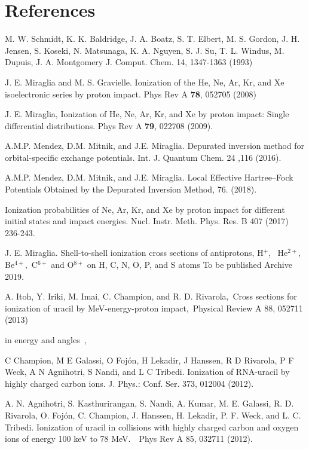 \documentclass[preprint,showpacs,pra]{revtex4-1}
\begin{document}
\bigskip

\section{References}

\begin{thebibliography}{99}

M. W. Schmidt, K. K. Baldridge, J. A. Boatz, S. T. Elbert, M. S. Gordon, 
J. H. Jensen, S. Koseki, N. Matsunaga, K. A. Nguyen, S. J. Su, T. L. Windus, 
M. Dupuis, J. A. Montgomery 
J. Comput. Chem. 14, 1347-1363 (1993)

J. E. Miraglia and M. S. Gravielle. Ionization of the
He, Ne, Ar, Kr, and Xe isoelectronic series by proton impact. Phys Rev A 
\textbf{78}, 052705 (2008)

J. E. Miraglia, Ionization of He, Ne, Ar, Kr, and Xe
by proton impact: Single differential distributions. Phys Rev A \textbf{79},
022708 (2009).

A.M.P. Mendez, D.M. Mitnik, and J.E. Miraglia.
Depurated inversion method for orbital-specific exchange potentials. 
Int. J. Quantum Chem. 24 ,116 (2016).

A.M.P. Mendez, D.M. Mitnik, and J.E. Miraglia. Local Effective 
Hartree--Fock Potentials Obtained by the Depurated Inversion Method,
76. (2018).

Ionization probabilities of Ne, Ar, Kr, and Xe by
proton impact for different initial states and impact energies. Nucl. Instr.
Meth. Phys. Res. B 407 (2017) 236-243.

J. E. Miraglia. Shell-to-shell ionization cross
sections of antiprotons, H$^{+}$, \ He$^{2+},$ Be$^{4+},$ C$^{6+}$ and O$%
^{8+}$ on H, C, N, O, P, and S atoms To be published Archive 2019.

A. Itoh, Y. Iriki, M. Imai, C. Champion, and R. D.
Rivarola,~Cross sections for ionization of uracil by MeV-energy-proton
impact,\ Physical Review A 88, 052711 (2013)

\bibitem{} in energy and angles~,

C Champion, M E Galassi, O Foj\'{o}n, H Lekadir, J Hanssen, R D Rivarola,
P F Weck, A N Agnihotri, S Nandi, and L C Tribedi. Ionization of RNA-uracil
by highly charged carbon ions. J. Phys.: Conf. Ser. 373, 012004 (2012).

A. N. Agnihotri, S. Kasthurirangan, S. Nandi, A.
Kumar, M. E. Galassi, R. D. Rivarola, O. Foj\'{o}n, C. Champion, J. Hanssen,
H. Lekadir, P. F. Weck, and L. C. Tribedi. Ionization of uracil in
collisions with highly charged carbon and oxygen ions of energy 100 keV to
78 MeV.\ \ Phys Rev A 85, 032711 (2012).


\end{thebibliography}
\end{document}
